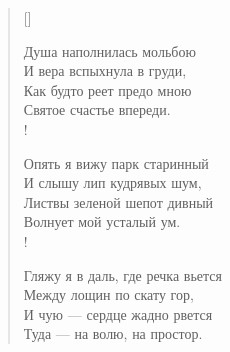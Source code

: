 \newpage
\vspace*{0cm}


\newpage
\vspace*{0cm}

\settowidth{\versewidth}{Опять я вижу парк старинный}
\begin{verse}[\versewidth]
\begin{altverse}
Душа наполнилась мольбою\\
    И вера вспыхнула в груди,\\
Как будто реет предо мною\\
    Святое счастье впереди.\\!

Опять я вижу парк старинный\\
    И слышу лип кудрявых шум,\\
Листвы зеленой шепот дивный\\
    Волнует мой усталый ум.\\!

Гляжу я в даль, где речка вьется\\
    Между лощин по скату гор,\\
И чую --- сердце жадно рвется\\
    Туда --- на волю, на простор.
\end{altverse}
\end{verse}

\newpage
\vspace*{0cm}



\newpage
\vspace*{0cm}

